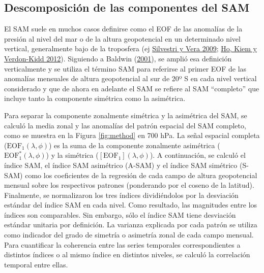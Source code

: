 \documentclass[12pt,oneside,a4paper]{reedthesis}
\begin{document}
\hypertarget{definition-of-indices}{%
\subsection{Descomposición de las componentes del SAM}\label{definition-of-indices}}

El SAM suele en muchos casos definirse como el EOF de las anomalías de la presión al nivel del mar o de la altura geopotencial en un determinado nivel vertical, generalmente bajo de la troposfera (ej \protect\hyperlink{ref-silvestri2009}{Silvestri y Vera 2009}; \protect\hyperlink{ref-ho2012}{Ho, Kiem y Verdon-Kidd 2012}).
Siguiendo a Baldwin (\protect\hyperlink{ref-baldwin2001}{2001}), se amplió esa definición verticalmente y se utiliza el término SAM para referirse al primer EOF de las anomalías mensuales de altura geopotencial al sur de 20º S en cada nivel vertical considerado y que de ahora en adelante el SAM se refiere al SAM ``completo'' que incluye tanto la componente simétrica como la asimétrica.

Para separar la componente zonalmente simétrica y la asimétrica del SAM, se calculó la media zonal y las anomalías del patrón espacial del SAM completo, como se muestra en la Figura \ref{fig:method} en 700 hPa.
La señal espacial completa (\(\mathrm{EOF_1}(\lambda, \phi)\)) es la suma de la componente zonalmente asimétrica (\(\mathrm{EOF_1^*}(\lambda, \phi)\)) y la simétrica (\([\mathrm{EOF_1}](\lambda, \phi)\)).
A continuación, se calculó el índice SAM, el índice SAM asimétrico (A-SAM) y el índice SAM simétrico (S-SAM) como los coeficientes de la regresión de cada campo de altura geopotencial mensual sobre los respectivos patrones (ponderando por el coseno de la latitud).
Finalmente, se normalizaron los tres índices dividiéndolos por la desviación estándar del índice SAM en cada nivel.
Como resultado, las magnitudes entre los índices son comparables.
Sin embargo, sólo el índice SAM tiene desviación estándar unitaria por definición.
La varianza explicada por cada patrón se utiliza como indicador del grado de simetría o asimetría zonal de cada campo mensual.
Para cuantificar la coherencia entre las series temporales correspondientes a distintos índices o al mismo índice en distintos niveles, se calculó la correlación temporal entre ellas.
\end{document}
